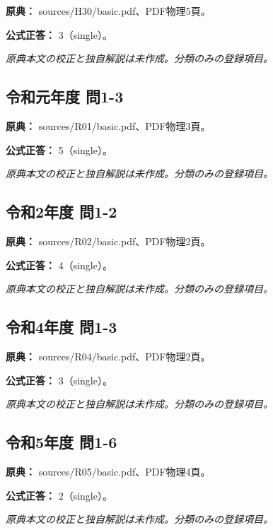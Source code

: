\noindent\textbf{原典：} sources/H30/basic.pdf、PDF物理5頁。

\textbf{公式正答：} 3（single）。

\par\textit{原典本文の校正と独自解説は未作成。分類のみの登録項目。}

\subsection{令和元年度 問1-3}
\label{q:r01-reg-basic-1-3}

\noindent\textbf{原典：} sources/R01/basic.pdf、PDF物理3頁。

\textbf{公式正答：} 5（single）。

\par\textit{原典本文の校正と独自解説は未作成。分類のみの登録項目。}

\subsection{令和2年度 問1-2}
\label{q:r02-reg-basic-1-2}

\noindent\textbf{原典：} sources/R02/basic.pdf、PDF物理2頁。

\textbf{公式正答：} 4（single）。

\par\textit{原典本文の校正と独自解説は未作成。分類のみの登録項目。}

\subsection{令和4年度 問1-3}
\label{q:r04-reg-basic-1-3}

\noindent\textbf{原典：} sources/R04/basic.pdf、PDF物理2頁。

\textbf{公式正答：} 3（single）。

\par\textit{原典本文の校正と独自解説は未作成。分類のみの登録項目。}

\subsection{令和5年度 問1-6}
\label{q:r05-reg-basic-1-6}

\noindent\textbf{原典：} sources/R05/basic.pdf、PDF物理4頁。

\textbf{公式正答：} 2（single）。

\par\textit{原典本文の校正と独自解説は未作成。分類のみの登録項目。}

